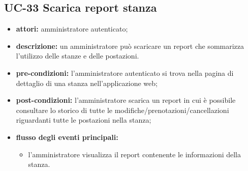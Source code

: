\subsection{UC-33 Scarica report stanza}
\begin{itemize}
    \item \textbf{attori:} amministratore autenticato;
    \item \textbf{descrizione:} un amministratore pu\`{o} scaricare un report che sommarizza l'utilizzo delle stanze e delle postazioni.
    \item \textbf{pre-condizioni:} l'amministratore autenticato si trova nella pagina di dettaglio di una stanza nell'applicazione web;
    \item \textbf{post-condizioni:} l'amministratore scarica un report in cui \`{e} possibile consultare lo storico di tutte le modifiche/prenotazioni/cancellazioni riguardanti tutte le postazioni nella stanza;
    \item \textbf{flusso degli eventi principali:}
    \begin{itemize}
        \item l'amministratore visualizza il report contenente le informazioni della stanza.
    \end{itemize}
\end{itemize}